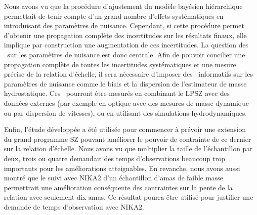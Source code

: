 Nous avons vu que la procédure d'ajustement du modèle bayésien hiérarchique permettait de tenir compte d'un grand nombre d'effets systématiques en introduisant des paramètres de nuisance.
Cependant, si cette procédure permet d'obtenir une propagation complète des incertitudes sur les résultats finaux, elle implique par construction une augmentation de ces incertitudes.
La question des \prior\ sur les paramètres de nuisance est donc centrale.
Afin de pouvoir concilier une propagation complète de toutes les incertitudes systématiques et une mesure précise de la relation d'échelle, il sera nécessaire d'imposer des \prior\ informatifs sur les paramètres de nuisance comme le biais et la dispersion de l'estimateur de masse hydrostatique.
Ces \prior\ pourront être mesurés en combinant le LPSZ avec des données externes (par exemple en optique avec des mesures de masse dynamique ou par dispersion de vitesses), ou en utilisant des simulations hydrodynamiques.

Enfin, l'étude développée a été utilisée pour commencer à prévoir une extension du grand programme SZ pouvant améliorer le pouvoir de contrainte de ce dernier sur la relation d'échelle.
Nous avons vu que multiplier la taille de l'échantillon par deux, trois ou quatre demandait des temps d'observations beaucoup trop importants pour les améliorations atteignables.
En revanche, nous avons aussi montré que le suivi avec NIKA2 d'un échantillon d'amas de faible masse permettrait une amélioration conséquente des contraintes sur la pente de la relation avec seulement dix amas.
Ce résultat pourra être utilisé pour justifier une demande de temps d'observation avec NIKA2.
